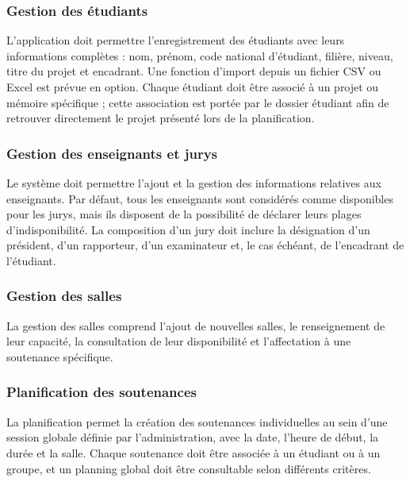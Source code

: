 \documentclass[12pt,a4paper]{article}
\begin{document}
\subsubsection{Gestion des étudiants}
\label{subsubsec:gestion_etudiants}

L'application doit permettre l'enregistrement des étudiants avec leurs
informations complètes : nom, prénom, code national d'étudiant, filière, niveau,
titre du projet et encadrant. Une fonction d'import depuis un fichier CSV ou
Excel est prévue en option. Chaque étudiant doit être associé à un projet ou
mémoire spécifique ; cette association est portée par le dossier étudiant afin de
retrouver directement le projet présenté lors de la planification.

\subsubsection{Gestion des enseignants et jurys}
\label{subsubsec:gestion_enseignants}

Le système doit permettre l'ajout et la gestion des informations relatives aux
enseignants. Par défaut, tous les enseignants sont considérés comme disponibles
pour les jurys, mais ils disposent de la possibilité de déclarer leurs plages
d'indisponibilité. La composition d'un jury doit inclure la désignation d'un
président, d'un rapporteur, d'un examinateur et, le cas échéant, de l'encadrant
de l'étudiant.

\subsubsection{Gestion des salles}
\label{subsubsec:gestion_salles}

La gestion des salles comprend l'ajout de nouvelles salles, le renseignement de
leur capacité, la consultation de leur disponibilité et l'affectation à une
soutenance spécifique.

\subsubsection{Planification des soutenances}
\label{subsubsec:planification}

La planification permet la création des soutenances individuelles au sein d'une
session globale définie par l'administration, avec la date, l'heure de début, la
durée et la salle. Chaque soutenance doit être associée à un étudiant ou à un
groupe, et un planning global doit être consultable selon différents critères.
\end{document}
